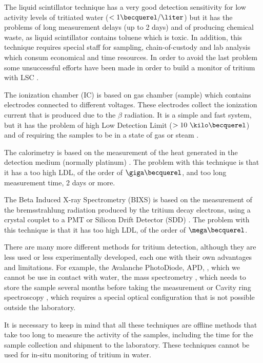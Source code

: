 The liquid scintillator technique has a very good detection sensitivity for low activity levels of tritiated water ($<1\becquerel/\liter$) but it has the problems of long measurement delays (up to 2 days) and of producing chemical waste, as liquid scintillator contains toluene which is toxic. In addition, this technique requires special staff for sampling, chain-of-custody and lab analysis which consum economical and time resources. In order to avoid the last problem some unsuccessful efforts have been made in order to build a monitor of tritium with LSC \cite{OnlineLSC}. 

The ionization chamber (IC) is based on gas chamber (sample) which contains electrodes connected to different voltages. These electrodes collect the ionization current that is produced due to the $\beta$ radiation. It is a simple and fast system, but it has the problem of high Low Detection Limit ($> 10~\kilo\becquerel$) and of requiring the samples to be in a state of gas or steam \cite{IonizationChamber1, IonizationChamber2}.

The calorimetry is based on the measurement of the heat generated in the detection medium (normally platinum) \cite{Calorimeter1, Calorimeter2}. The problem with this technique is that it has a too high LDL, of the order of $\giga\becquerel$, and too long measurement time, 2 days or more.

The Beta Induced X-ray Spectrometry (BIXS) is based on the measurement of the bremsstrahlung radiation produced by the tritium decay electrons, using a  crystal couplet to a PMT  \cite{XRays1, XRays2} or Silicon Drift Detector (SDD) \cite{Bremstrahlung}. The problem with this technique is that it has too high LDL, of the order of $\mega\becquerel$.

There are many more different methods for tritium detection, although they are less used or less experimentally developed, each one with their own advantages and limitations. For example, the Avalanche PhotoDiode, APD, \cite{APD}, which we cannot be use in contact with water, the mass spectrometry \cite{Spectrometry}, which needs to store the sample several months before taking the measurement or Cavity ring spectroscopy \cite{Ring}, which requires a special optical configuration that is not possible outside the laboratory.

It is necessary to keep in mind that all these techniques are offline methods that take too long to measure the activity of the samples, including the time for the sample collection and shipment to the laboratory. These techniques cannot be used for in-situ monitoring of tritium in water.

